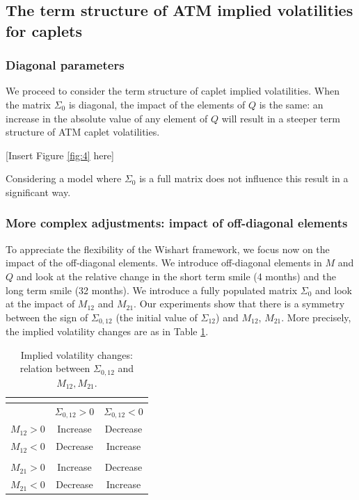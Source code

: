 \subsection{The term structure of ATM implied volatilities for caplets}
\subsubsection{Diagonal parameters}
We proceed to consider the term structure of caplet implied volatilities. When the matrix $\Sigma_0$ is diagonal, the impact of the elements of $Q$ is the same: an increase in the absolute value of any element of $Q$ will result in a steeper term structure of ATM caplet volatilities.
\begin{center}
[Insert Figure \ref{fig:4}  here]
\end{center}
Considering a model where $\Sigma_0$ is a full matrix does not influence this result in a significant way.

\subsubsection{More complex adjustments: impact of off-diagonal elements}
To appreciate the flexibility of the Wishart framework, we focus now on the impact of the off-diagonal elements. We introduce off-diagonal elements in $M$ and $Q$ and look at the relative change in the short term smile (4 months) and the long term smile (32 months).
We introduce a fully populated matrix $\Sigma_0$ and look at the impact of $M_{12}$ and $M_{21}$. Our experiments show that there is a symmetry between the sign of $\Sigma_{0,12}$ (the initial value of $\Sigma_{12}$) and $M_{12}$, $M_{21}$. More precisely, the implied volatility changes are as in Table \ref{tab:ImpliedVolatilityChanges}.	
\begin{table}[h]
\centering
	\begin{tabular}{ccc}
\multicolumn{3}{c}{  } \\ \hline
	 &$\Sigma_{0,12}>0$&$\Sigma_{0,12}<0$\\  \hline  \hline
	 $M_{12}>0$&Increase&Decrease\\
	 $M_{12}<0$&Decrease&Increase \\
	 &&\\   \hline
   $M_{21}>0$&Increase&Decrease\\
	 $M_{21}<0$&Decrease&Increase \\ \hline
	\end{tabular}
	\caption{Implied volatility changes: relation between $\Sigma_{0,12}$ and $M_{12},M_{21}$.}
	\label{tab:ImpliedVolatilityChanges}
\end{table}






